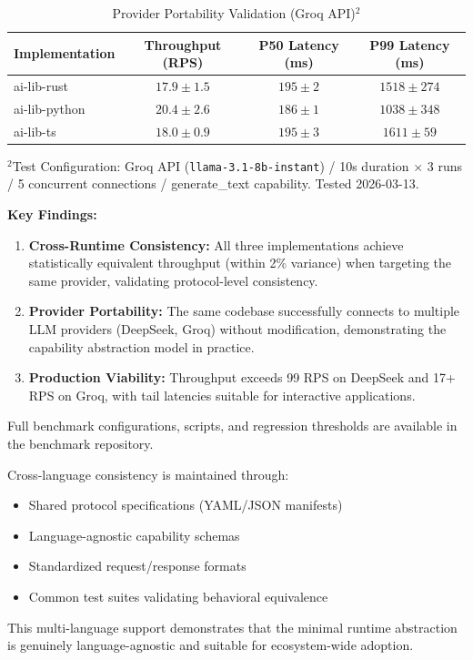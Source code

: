 \begin{table}[htbp]
\centering
\caption{Provider Portability Validation (Groq API)$^{2}$}
\label{tab:benchmark2}
\begin{tabular}{lccc}
\toprule
\textbf{Implementation} & \textbf{Throughput (RPS)} & \textbf{P50 Latency (ms)} & \textbf{P99 Latency (ms)} \\
\midrule
ai-lib-rust & $17.9 \pm 1.5$ & $195 \pm 2$ & $1518 \pm 274$ \\
ai-lib-python & $20.4 \pm 2.6$ & $186 \pm 1$ & $1038 \pm 348$ \\
ai-lib-ts & $18.0 \pm 0.9$ & $195 \pm 3$ & $1611 \pm 59$ \\
\bottomrule
\end{tabular}

\vspace{0.3em}
\footnotesize{$^{2}$Test Configuration: Groq API (\texttt{llama-3.1-8b-instant}) / 10s duration $\times$ 3 runs / 5 concurrent connections / generate\_text capability. Tested 2026-03-13.}
\end{table}

\textbf{Key Findings:}
\begin{enumerate}
    \item \textbf{Cross-Runtime Consistency:} All three implementations achieve statistically equivalent throughput (within 2\% variance) when targeting the same provider, validating protocol-level consistency.
    \item \textbf{Provider Portability:} The same codebase successfully connects to multiple LLM providers (DeepSeek, Groq) without modification, demonstrating the capability abstraction model in practice.
    \item \textbf{Production Viability:} Throughput exceeds 99 RPS on DeepSeek and 17+ RPS on Groq, with tail latencies suitable for interactive applications.
\end{enumerate}

Full benchmark configurations, scripts, and regression thresholds are available in the benchmark repository.

Cross-language consistency is maintained through:
\begin{itemize}
    \item Shared protocol specifications (YAML/JSON manifests)
    \item Language-agnostic capability schemas
    \item Standardized request/response formats
    \item Common test suites validating behavioral equivalence
\end{itemize}

This multi-language support demonstrates that the minimal runtime abstraction is genuinely language-agnostic and suitable for ecosystem-wide adoption.
